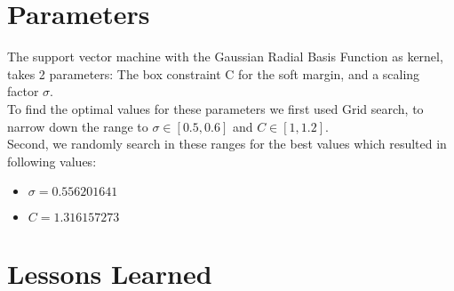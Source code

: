 \documentclass[a4paper, 11pt]{article}
\begin{document}
\section{Parameters}
\label{sec:Parameters}
The support vector machine with the Gaussian Radial Basis Function as kernel, takes 2 parameters: The box constraint C for the soft margin, and a scaling factor $\sigma$.\\
To find the optimal values for these parameters we first used Grid search, to narrow down the range to $\sigma \in [0.5, 0.6]$ and $C \in [1, 1.2]$.\\
Second, we randomly search in these ranges for the best values which resulted in following values:\\
\begin{itemize}
\item $\sigma=0.556201641$
\item $C=1.316157273$
\end{itemize}

\section{Lessons Learned}
\end{document}
